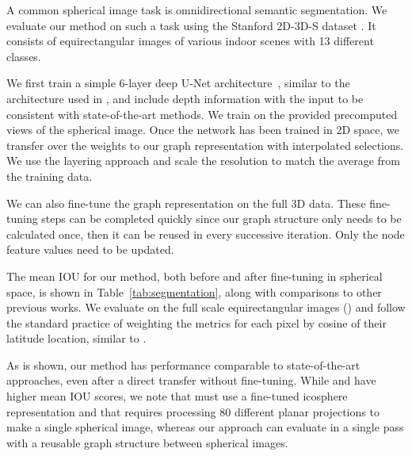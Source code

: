 \documentclass[10pt,twocolumn,letterpaper]{article}
\begin{document}
A common spherical image task is omnidirectional semantic segmentation. We evaluate our method on such a task using the Stanford 2D-3D-S dataset \cite{Armeni2017}. It consists of equirectangular images of various indoor scenes with 13 different classes. 

We first train a simple 6-layer deep U-Net architecture~\cite{UNet}, similar to the architecture used in \cite{Chiyu2019,Zhang2019}, 
and include depth information with the input to be consistent with state-of-the-art methods. 
We train on the provided precomputed views of the spherical image. Once the network has been trained in 2D space, we transfer over the weights to our graph representation with interpolated selections. We use the layering approach and scale the resolution to match the average  from the training data.

We can also fine-tune the graph representation on the full 3D data. These fine-tuning steps can be completed quickly since our graph structure only needs to be calculated once, then it can be reused in every successive iteration. Only the node feature values need to be updated.

The mean IOU for our method, both before and after fine-tuning in spherical space, is shown in Table~\ref{tab:segmentation}, along with comparisons to other previous works. We evaluate on the full scale equirectangular images () and follow the standard practice of weighting the metrics for each pixel by cosine of their latitude location, similar to \cite{Chiyu2019,Zhang2019}. 

As is shown, our method has performance comparable to state-of-the-art approaches, even after a direct transfer without fine-tuning. While \cite{Zhang2019} and \cite{Eder2020} have higher mean IOU scores,
we note that \cite{Zhang2019} must use a fine-tuned icosphere representation 
and that \cite{Eder2020} requires processing 80 different  planar projections to make a single spherical image, whereas our approach can evaluate in a single pass with a reusable graph structure between spherical images.
\end{document}
